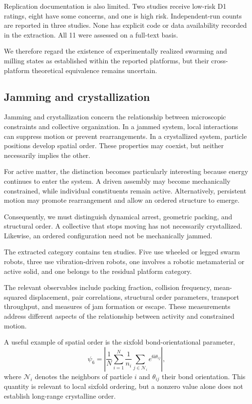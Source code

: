 Replication documentation is also
limited. Two studies receive
low-risk D1 ratings, eight
have some concerns, and one
is high risk. Independent-run
counts are reported in three
studies. None has explicit
code or data availability
recorded in the extraction.
All 11 were assessed on
a full-text basis.

We therefore regard the existence
of experimentally realized
swarming and milling states
as established within the
reported platforms, but their
cross-platform theoretical
equivalence remains uncertain.

\subsection{Jamming and crystallization}
\label{sec:phenomena-jamming}

Jamming and crystallization concern the relationship
between microscopic constraints and collective
organization. In a jammed system, local interactions
can suppress motion or prevent rearrangements.
In a crystallized system, particle positions
develop spatial order. These properties may
coexist, but neither necessarily implies
the other.

For active matter, the distinction becomes
particularly interesting because energy
continues to enter the system. A driven
assembly may become mechanically constrained,
while individual constituents remain active.
Alternatively, persistent motion may promote
rearrangement and allow an ordered structure
to emerge.

Consequently, we must distinguish dynamical
arrest, geometric packing, and structural
order. A collective that stops moving
has not necessarily crystallized.
Likewise, an ordered configuration
need not be mechanically jammed.

The extracted category contains ten studies.
Five use wheeled or legged swarm robots,
three use vibration-driven robots,
one involves a robotic metamaterial
or active solid, and one belongs
to the residual platform category.

The relevant observables include
packing fraction, collision frequency,
mean-squared displacement,
pair correlations, structural
order parameters, transport
throughput, and measures
of jam formation or escape.
These measurements address
different aspects of the
relationship between activity
and constrained motion.

A useful example of spatial order
is the sixfold bond-orientational
parameter,
\begin{equation}
\psi_6 =
\left|
\frac{1}{N}
\sum_{i=1}^{N}
\frac{1}{n_i}
\sum_{j\in\mathcal N_i}
e^{6\mathrm{i}\theta_{ij}}
\right|,
\label{eq:phenomena-hexatic}
\end{equation}
where $\mathcal N_i$ denotes the
neighbors of particle $i$ and
$\theta_{ij}$ their bond orientation.
This quantity is relevant to
local sixfold ordering, but
a nonzero value alone
does not establish
long-range crystalline order.

